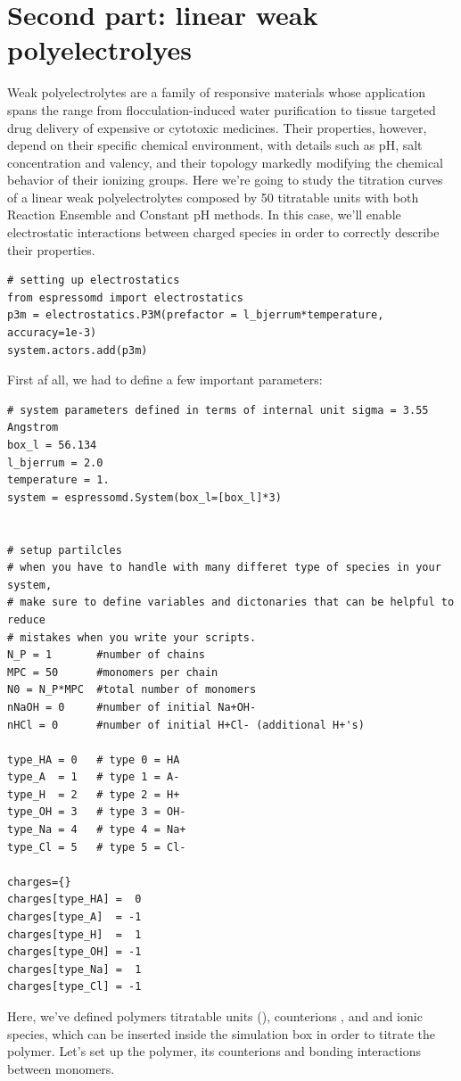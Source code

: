 \documentclass[
a4paper,                        %
11pt,                           %
twoside,                        %
footsepline,                    %
headsepline,                    %
headexclude,                    %
footexclude,                    %
pagesize,                       %
]{scrartcl}
\begin{document}
\section{Second part: linear weak polyelectrolyes}
Weak polyelectrolytes are a family of responsive materials whose application spans the range from flocculation-induced water purification to tissue targeted drug delivery of expensive or cytotoxic medicines. Their properties, however, depend on their specific chemical environment, with details such as pH, salt concentration and valency, and their topology markedly modifying the chemical behavior of their ionizing groups.
Here we're going to study the titration curves of a linear weak polyelectrolytes composed by 50 titratable units with both Reaction Ensemble and Constant pH methods. In this case, we'll enable electrostatic interactions between charged species in order to correctly describe their properties.
\begin{verbatim}
# setting up electrostatics
from espressomd import electrostatics
p3m = electrostatics.P3M(prefactor = l_bjerrum*temperature, accuracy=1e-3) 
system.actors.add(p3m)
\end{verbatim}
First af all, we had to define a few important  parameters:
\begin{verbatim}
# system parameters defined in terms of internal unit sigma = 3.55 Angstrom 
box_l = 56.134 
l_bjerrum = 2.0 
temperature = 1.
system = espressomd.System(box_l=[box_l]*3)


# setup partilcles
# when you have to handle with many differet type of species in your system,
# make sure to define variables and dictonaries that can be helpful to reduce
# mistakes when you write your scripts.
N_P = 1       #number of chains
MPC = 50      #monomers per chain
N0 = N_P*MPC  #total number of monomers
nNaOH = 0     #number of initial Na+OH-
nHCl = 0      #number of initial H+Cl- (additional H+'s)

type_HA = 0   # type 0 = HA
type_A  = 1   # type 1 = A-
type_H  = 2   # type 2 = H+
type_OH = 3   # type 3 = OH-
type_Na = 4   # type 4 = Na+
type_Cl = 5   # type 5 = Cl-

charges={}
charges[type_HA] =  0    
charges[type_A]  = -1     
charges[type_H]  =  1
charges[type_OH] = -1
charges[type_Na] =  1
charges[type_Cl] = -1 
\end{verbatim}
Here, we've defined polymers titratable units (), counterions , and  and  ionic species, which can be inserted inside the simulation box in order to titrate the polymer. Let's set up the polymer, its counterions and bonding interactions between monomers. 
\end{document}
